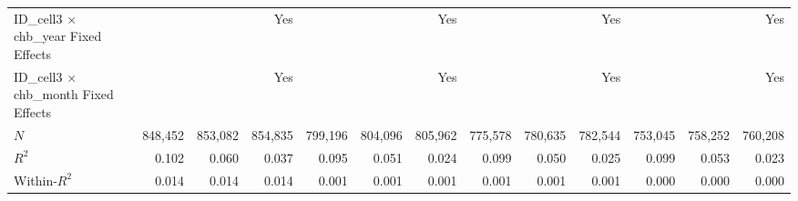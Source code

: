 \begin{tabular}{lrrrrrrrrrrrr}
ID\_cell3 $\times$ chb\_year Fixed Effects  &              &              &          Yes &              &              &          Yes &              &              &          Yes &              &              &          Yes \\ 
ID\_cell3 $\times$ chb\_month Fixed Effects &              &              &          Yes &              &              &          Yes &              &              &          Yes &              &              &          Yes \\ 
\midrule
$N$                                         &      848,452 &      853,082 &      854,835 &      799,196 &      804,096 &      805,962 &      775,578 &      780,635 &      782,544 &      753,045 &      758,252 &      760,208 \\ 
$R^2$                                       &        0.102 &        0.060 &        0.037 &        0.095 &        0.051 &        0.024 &        0.099 &        0.050 &        0.025 &        0.099 &        0.053 &        0.023 \\ 
Within-$R^2$                                &        0.014 &        0.014 &        0.014 &        0.001 &        0.001 &        0.001 &        0.001 &        0.001 &        0.001 &        0.000 &        0.000 &        0.000 \\ 
\bottomrule
\end{tabular}
